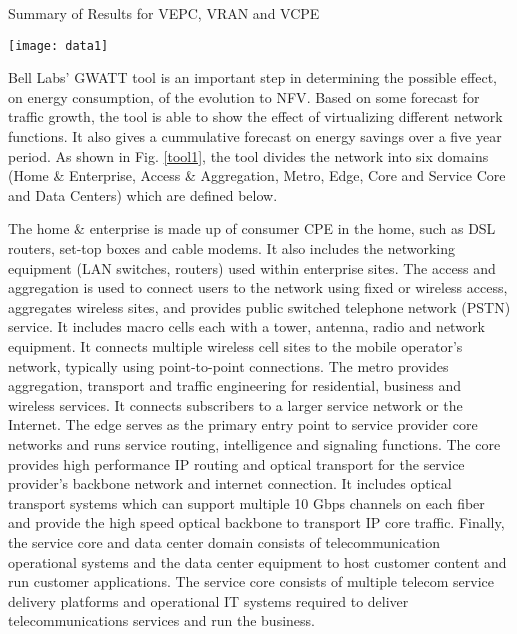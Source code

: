 \documentclass[conference]{IEEEtran}
\begin{document}
 \begin{table*}[t]
\caption{Summary of Results for VEPC, VRAN and VCPE}
\label{data1}
\centering
\texttt{[image: data1]}
\end{table*}



Bell Labs' GWATT tool \cite{GWATT} is an important step in determining the possible effect, on energy consumption, of the evolution to \ac{NFV}. Based on some forecast for traffic growth, the tool is able to show the effect of virtualizing different network functions. It also gives a cummulative forecast on energy savings over a five year period. As shown in Fig. \ref{tool1}, the tool divides the network into six domains (Home \& Enterprise, Access \& Aggregation, Metro, Edge, Core and Service Core and Data Centers) which are defined below.

The home \& enterprise is made up of consumer \ac{CPE} in the home, such as DSL routers, set-top boxes and cable modems. It also includes the networking equipment (LAN switches, routers) used within enterprise sites. The access and aggregation is used to connect users to the network using fixed or wireless access, aggregates wireless sites, and provides public switched telephone network (PSTN) service. It includes macro cells each with a tower, antenna, radio and network equipment. It connects multiple wireless cell sites to the mobile operator's network, typically using point-to-point connections. The metro provides aggregation, transport and traffic engineering for residential, business and wireless services. It connects subscribers to a larger service network or the Internet. The edge serves as the primary entry point to service provider core networks and runs service routing, intelligence and signaling functions. The core provides high performance IP routing and optical transport for the service provider's backbone network and internet connection. It includes optical transport systems which can support multiple 10 Gbps channels on each fiber and provide the high speed optical backbone to transport IP core traffic. Finally, the service core and data center domain consists of telecommunication operational systems and the data center equipment to host customer content and run customer applications. The service core consists of multiple telecom service delivery platforms and operational IT systems required to deliver telecommunications services and run the business.
\end{document}
